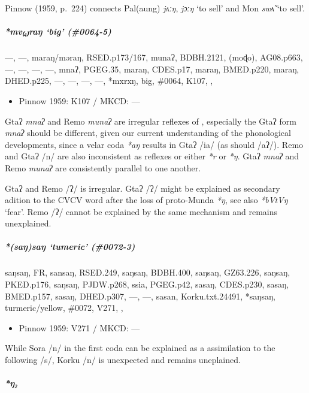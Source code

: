 \documentclass[a4paper,]{article}
\providecommand{\tightlist}{%
  \setlength{\itemsep}{0pt}\setlength{\parskip}{0pt}}
\let\oldparagraph\paragraph
\renewcommand{\paragraph}[1]{\oldparagraph{#1}\mbox{}}
\let\oldsubparagraph\subparagraph
\renewcommand{\subparagraph}[1]{\oldsubparagraph{#1}\mbox{}}
\begin{document}
Pinnow (1959, p.~224) connects Pal(aung) \emph{jʌːŋ}, \emph{jɔːŋ} `to
sell' and Mon \emph{swʌ̃} `to sell'.

\subparagraph{\texorpdfstring{\emph{*mv₍₄₎raŋ} `big'
(\#0064-5)}{*mv₍₄₎raŋ big (\#0064-5)}}\label{mvraux14b-big-0064-5}

---, ---, maraŋ/məraŋ, RSED.p173/167, munaʔ, BDBH.2121, (moɖo),
AG08.p663, ---, ---, ---, ---, mnaʔ, PGEG.35, maraŋ, CDES.p17, maraŋ,
BMED.p220, maraŋ, DHED.p225, ---, ---, ---, ---, *mxrxŋ, big, \#0064,
K107, ,

\begin{itemize}
\tightlist
\item
  Pinnow 1959: K107 / MKCD: ---
\end{itemize}

Gtaʔ \emph{mnaʔ} and Remo \emph{munaʔ} are irregular reflexes of ,
especially the Gtaʔ form \emph{mnaʔ} should be different, given our
current understanding of the phonological developments, since a velar
coda \emph{*aŋ} results in Gtaʔ /ia/ (as should /aʔ/). Remo and Gtaʔ /n/
are also inconsistent as reflexes or either \emph{*r} or \emph{*ŋ}. Gtaʔ
\emph{mnaʔ} and Remo \emph{munaʔ} are consistently parallel to one
another.

Gtaʔ and Remo /ʔ/ is irregular. Gtaʔ /ʔ/ might be explained as secondary
adition to the CVCV word after the loss of proto-Munda \emph{*ŋ}, see
also \emph{*bVtVŋ} `fear'. Remo /ʔ/ cannot be explained by the same
mechanism and remains unexplained.

\subparagraph{\texorpdfstring{\emph{*(saŋ)saŋ} `tumeric'
(\#0072-3)}{*(saŋ)saŋ tumeric (\#0072-3)}}\label{saux14bsaux14b-tumeric-0072-3}

saŋsaŋ, FR, sansaŋ, RSED.249, saŋsaŋ, BDBH.400, saŋsaŋ, GZ63.226,
saŋsaŋ, PKED.p176, saŋsaŋ, PJDW.p268, ssia, PGEG.p42, sasaŋ, CDES.p230,
sasaŋ, BMED.p157, sasaŋ, DHED.p307, ---, ---, sasan, Korku.txt.24491,
*saŋsaŋ, turmeric/yellow, \#0072, V271, ,

\begin{itemize}
\tightlist
\item
  Pinnow 1959: V271 / MKCD: ---
\end{itemize}

While Sora /n/ in the first coda can be explained as a assimilation to
the following /s/, Korku /n/ is unexpected and remains uneplained.

\paragraph{\texorpdfstring{\emph{*ŋ₂}}{*ŋ₂}}\label{ux14b-1}
\end{document}
